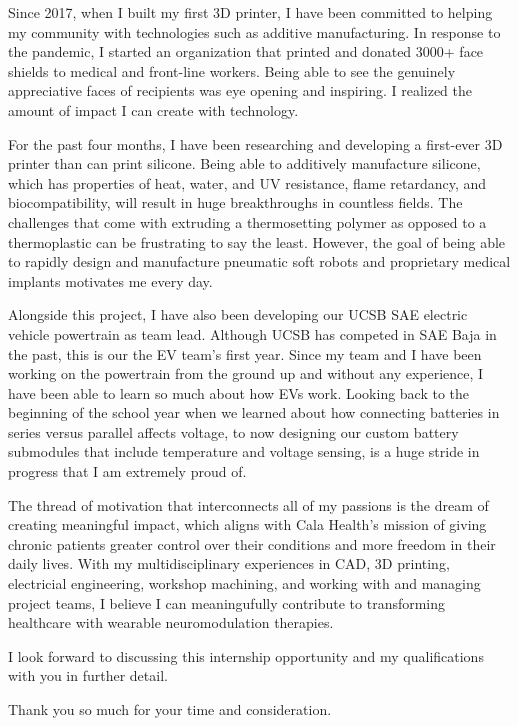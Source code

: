 \documentclass[11pt, letterpaper]{awesome-cv} %
\begin{document}
\makecvheader %

\makelettertitle %


\begin{cvletter}


Since 2017, when I built my first 3D printer, I have been committed to helping my community with technologies such as additive manufacturing. In response to the pandemic, I started an organization that printed and donated 3000+ face shields to medical and front-line workers. Being able to see the genuinely appreciative faces of recipients was eye opening and inspiring. I realized the amount of impact I can create with technology.

For the past four months, I have been researching and developing a first-ever 3D printer than can print silicone. Being able to additively manufacture silicone, which has properties of heat, water, and UV resistance, flame retardancy, and biocompatibility, will result in huge breakthroughs in countless fields. The challenges that come with extruding a thermosetting polymer as opposed to a thermoplastic can be frustrating to say the least. However, the goal of being able to rapidly design and manufacture pneumatic soft robots and proprietary medical implants motivates me every day. 

Alongside this project, I have also been developing our UCSB SAE electric vehicle powertrain as team lead. Although UCSB has competed in SAE Baja in the past, this is our the EV team's first year. Since my team and I have been working on the powertrain from the ground up and without any experience, I have been able to learn so much about how EVs work. Looking back to the beginning of the school year when we learned about how connecting batteries in series versus parallel affects voltage, to now designing our custom battery submodules that include temperature and voltage sensing, is a huge stride in progress that I am extremely proud of. 

The thread of motivation that interconnects all of my passions is the dream of creating meaningful impact, which aligns with Cala Health's mission of giving chronic patients greater control over their conditions and more freedom in their daily lives. With my multidisciplinary experiences in CAD, 3D printing, electricial engineering, workshop machining, and working with and managing project teams, I believe I can meaningufully contribute to transforming healthcare with wearable neuromodulation therapies. 

I look forward to discussing this internship opportunity and my qualifications with you in further detail.

Thank you so much for your time and consideration.


\end{cvletter}


\makeletterclosing %
\end{document}
